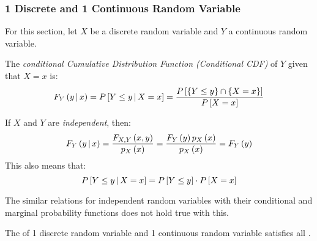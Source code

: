 			\subsubsection{1 Discrete and 1 Continuous Random Variable} \label{subsubsec:1 Discrete 1 Continuous Random Variables}
			For this section, let $X$ be a discrete random variable and $Y$ a continuous random variable.
				\begin{definition} \label{def:1 Discrete 1 Continuous-Conditional CDF}
					The \emph{conditional Cumulative Distribution Function (Conditional CDF)} of $Y$ given that $X=x$ is:
					\begin{equation} \label{eq:1 Discrete 1 Continuous-Conditional CDF}
						F_{Y} \left( y \operatorname{\vert} x \right) = P \left[ Y \leq y \operatorname{\vert} X=x \right]
						= \frac{P \left[ \lbrace Y \leq y \rbrace \cap \lbrace X=x \rbrace \right]}{P \left[ X=x \right]}
					\end{equation}
					\begin{remark}
						If $X$ and $Y$ are \emph{independent}, then:
						\begin{equation} \label{eq:1 Discrete 1 Continuous-Independent Conditional CDF}
							F_{Y} \left( y \operatorname{\vert} x \right)
							= \frac{F_{X,Y} \left( x,y \right)}{p_{X} \left( x \right)}
							= \frac{F_{Y} \left( y \right) p_{X} \left( x \right)}{p_{X} \left( x \right)}
							= F_{Y} \left( y \right)
						\end{equation}
						This also means that:
						\begin{equation*}
							P \left[ Y \leq y \operatorname{\vert} X=x \right]
							= P \left[ Y \leq y \right] \cdot P \left[ X=x \right]
						\end{equation*}
					\end{remark}
					\begin{remark}
						The similar relations for independent random variables with their conditional and marginal probability functions does not hold true with this.
					\end{remark}
					\begin{remark}
						The  of 1 discrete random variable and 1 continuous random variable satisfies all .
					\end{remark}
				\end{definition}
